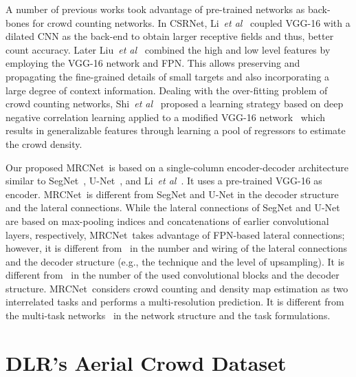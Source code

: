 \documentclass{bmvc2k}
\newcommand{\XNET}{MRCNet}
\def\etal{\emph{et al}\bmvaOneDot}
\begin{document}
A number of previous works took advantage of pre-trained networks as back-bones for crowd counting networks. In CSRNet, Li~\etal~\cite{Li2018} coupled VGG-16  with a dilated CNN as the back-end to obtain larger receptive fields and thus, better count accuracy. 
Later Liu~\etal~\cite{Liu2018b} combined the high and low level features by employing the VGG-16 network and FPN. 
This allows preserving and propagating the fine-grained details of small targets and also incorporating a large degree of context information.
Dealing with the over-fitting problem of crowd counting networks, Shi~\etal~\cite{Shi2018} proposed a learning strategy based on deep negative correlation learning applied to a modified VGG-16 network~\cite{Simonyan2015} which results in generalizable features through learning a pool of regressors to estimate the crowd density.


Our proposed \XNET~is based on a single-column encoder-decoder architecture similar to SegNet~\cite{Badrinarayanan2017}, U-Net~\cite{Ronneberger2015}, and Li~\etal~\cite{Liu2018b}. It uses a pre-trained VGG-16 as encoder. \XNET~is different from SegNet and U-Net in the decoder structure and the lateral connections. While the lateral connections of SegNet and U-Net are based on max-pooling indices and concatenations of earlier convolutional layers, respectively, \XNET~takes advantage of FPN-based lateral connections; however, it is different from~\cite{Liu2018b} in the number and wiring of the lateral connections and the decoder structure (e.g., the technique and the level of upsampling). It is different from~\cite{Li2018} in the number of the used convolutional blocks and the decoder structure. \XNET~considers crowd counting and density map estimation as two interrelated tasks and performs a multi-resolution prediction. It is different from the multi-task networks~\cite{Idrees2018,Sindagi2017} in the network structure and the task formulations.  


\section{DLR's Aerial Crowd Dataset}
\end{document}
